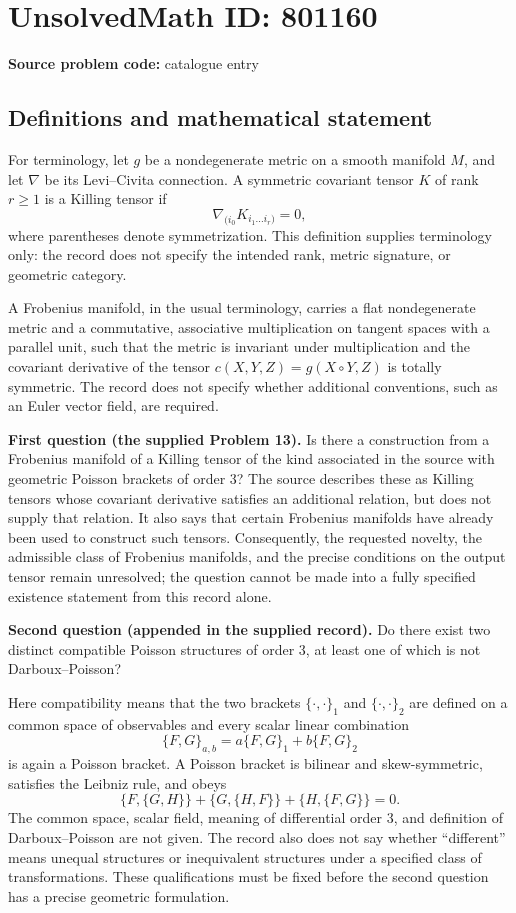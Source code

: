 \documentclass[11pt]{article}
\begin{document}
\section*{UnsolvedMath ID: 801160}
\textbf{Source problem code:} catalogue entry
\subsection{Definitions and mathematical statement}
For terminology, let \(g\) be a nondegenerate metric on a smooth manifold \(M\), and let \(\nabla\) be its Levi--Civita connection. A symmetric covariant tensor \(K\) of rank \(r\geq 1\) is a Killing tensor if
\[
\nabla_{(i_0}K_{i_1\dots i_r)}=0,
\]
where parentheses denote symmetrization. This definition supplies terminology only: the record does not specify the intended rank, metric signature, or geometric category.

A Frobenius manifold, in the usual terminology, carries a flat nondegenerate metric and a commutative, associative multiplication on tangent spaces with a parallel unit, such that the metric is invariant under multiplication and the covariant derivative of the tensor \(c(X,Y,Z)=g(X\circ Y,Z)\) is totally symmetric. The record does not specify whether additional conventions, such as an Euler vector field, are required.

\textbf{First question (the supplied Problem 13).} Is there a construction from a Frobenius manifold of a Killing tensor of the kind associated in the source with geometric Poisson brackets of order \(3\)? The source describes these as Killing tensors whose covariant derivative satisfies an additional relation, but does not supply that relation. It also says that certain Frobenius manifolds have already been used to construct such tensors. Consequently, the requested novelty, the admissible class of Frobenius manifolds, and the precise conditions on the output tensor remain unresolved; the question cannot be made into a fully specified existence statement from this record alone.

\textbf{Second question (appended in the supplied record).} Do there exist two distinct compatible Poisson structures of order \(3\), at least one of which is not Darboux--Poisson?

Here compatibility means that the two brackets \(\{\cdot,\cdot\}_1\) and \(\{\cdot,\cdot\}_2\) are defined on a common space of observables and every scalar linear combination
\[
\{F,G\}_{a,b}=a\{F,G\}_1+b\{F,G\}_2
\]
is again a Poisson bracket. A Poisson bracket is bilinear and skew-symmetric, satisfies the Leibniz rule, and obeys
\[
\{F,\{G,H\}\}+\{G,\{H,F\}\}+\{H,\{F,G\}\}=0.
\]
The common space, scalar field, meaning of differential order \(3\), and definition of Darboux--Poisson are not given. The record also does not say whether ``different'' means unequal structures or inequivalent structures under a specified class of transformations. These qualifications must be fixed before the second question has a precise geometric formulation.
\end{document}
